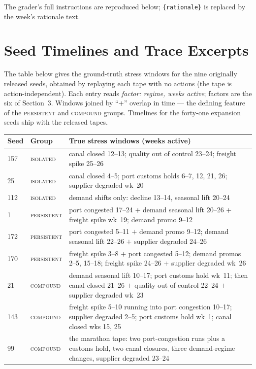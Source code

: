 \documentclass{article}
\begin{document}
The grader's full instructions are reproduced below; \texttt{\{rationale\}}
is replaced by the week's rationale text.

{\footnotesize}

\section{Seed Timelines and Trace Excerpts}
\label{app:seeds}

The table below gives the ground-truth
stress windows for the nine originally released seeds, obtained by replaying
each tape with no actions (the tape is action-independent). Each entry reads
\emph{factor: regime, weeks active}; factors are the six of Section~3.
Windows joined by ``$+$'' overlap in time --- the defining feature of the
\textsc{persistent} and \textsc{compound} groups. Timelines for the
forty-one expansion seeds ship with the released tapes.

\begin{center}
\small
\begin{tabular}{llp{9.2cm}}
\toprule
Seed & Group & True stress windows (weeks active) \\
\midrule
157 & \textsc{isolated} & canal closed 12--13; quality out of control 23--24; freight spike 25--26 \\
25  & \textsc{isolated} & canal closed 4--5; port customs holds 6--7, 12, 21, 26; supplier degraded wk~20 \\
112 & \textsc{isolated} & demand shifts only: decline 13--14, seasonal lift 20--24 \\
1   & \textsc{persistent} & port congested 17--24 $+$ demand seasonal lift 20--26 $+$ freight spike wk~19; demand promo 9--12 \\
172 & \textsc{persistent} & port congested 5--11 $+$ demand promo 9--12; demand seasonal lift 22--26 $+$ supplier degraded 24--26 \\
170 & \textsc{persistent} & freight spike 3--8 $+$ port congested 5--12; demand promos 2--5, 15--18; freight spike 24--26 $+$ supplier degraded wk~26 \\
21  & \textsc{compound} & demand seasonal lift 10--17; port customs hold wk~11; then canal closed 21--26 $+$ quality out of control 22--24 $+$ supplier degraded wk~23 \\
143 & \textsc{compound} & freight spike 5--10 running into port congestion 10--17; supplier degraded 2--5; port customs hold wk~1; canal closed wks 15, 25 \\
99  & \textsc{compound} & the marathon tape: two port-congestion runs plus a customs hold, two canal closures, three demand-regime changes, supplier degraded 23--24 \\
\bottomrule
\end{tabular}
\end{center}
\end{document}

